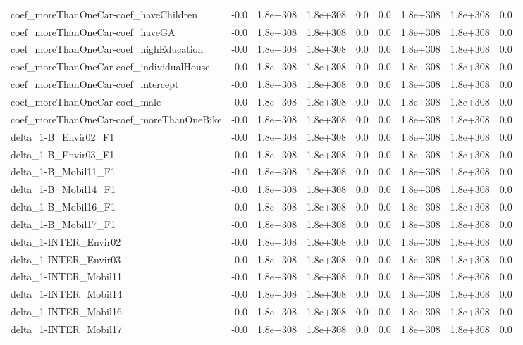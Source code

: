 \begin{tabular}{lrrrrrrrr}
coef_moreThanOneCar-coef_haveChildren & -0.0 & 1.8e+308 & 1.8e+308 & 0.0 & 0.0 & 1.8e+308 & 1.8e+308 & 0.0 \\
coef_moreThanOneCar-coef_haveGA & -0.0 & 1.8e+308 & 1.8e+308 & 0.0 & 0.0 & 1.8e+308 & 1.8e+308 & 0.0 \\
coef_moreThanOneCar-coef_highEducation & -0.0 & 1.8e+308 & 1.8e+308 & 0.0 & 0.0 & 1.8e+308 & 1.8e+308 & 0.0 \\
coef_moreThanOneCar-coef_individualHouse & -0.0 & 1.8e+308 & 1.8e+308 & 0.0 & 0.0 & 1.8e+308 & 1.8e+308 & 0.0 \\
coef_moreThanOneCar-coef_intercept & -0.0 & 1.8e+308 & 1.8e+308 & 0.0 & 0.0 & 1.8e+308 & 1.8e+308 & 0.0 \\
coef_moreThanOneCar-coef_male & -0.0 & 1.8e+308 & 1.8e+308 & 0.0 & 0.0 & 1.8e+308 & 1.8e+308 & 0.0 \\
coef_moreThanOneCar-coef_moreThanOneBike & -0.0 & 1.8e+308 & 1.8e+308 & 0.0 & 0.0 & 1.8e+308 & 1.8e+308 & 0.0 \\
delta_1-B_Envir02_F1 & -0.0 & 1.8e+308 & 1.8e+308 & 0.0 & 0.0 & 1.8e+308 & 1.8e+308 & 0.0 \\
delta_1-B_Envir03_F1 & -0.0 & 1.8e+308 & 1.8e+308 & 0.0 & 0.0 & 1.8e+308 & 1.8e+308 & 0.0 \\
delta_1-B_Mobil11_F1 & -0.0 & 1.8e+308 & 1.8e+308 & 0.0 & 0.0 & 1.8e+308 & 1.8e+308 & 0.0 \\
delta_1-B_Mobil14_F1 & -0.0 & 1.8e+308 & 1.8e+308 & 0.0 & 0.0 & 1.8e+308 & 1.8e+308 & 0.0 \\
delta_1-B_Mobil16_F1 & -0.0 & 1.8e+308 & 1.8e+308 & 0.0 & 0.0 & 1.8e+308 & 1.8e+308 & 0.0 \\
delta_1-B_Mobil17_F1 & -0.0 & 1.8e+308 & 1.8e+308 & 0.0 & 0.0 & 1.8e+308 & 1.8e+308 & 0.0 \\
delta_1-INTER_Envir02 & -0.0 & 1.8e+308 & 1.8e+308 & 0.0 & 0.0 & 1.8e+308 & 1.8e+308 & 0.0 \\
delta_1-INTER_Envir03 & -0.0 & 1.8e+308 & 1.8e+308 & 0.0 & 0.0 & 1.8e+308 & 1.8e+308 & 0.0 \\
delta_1-INTER_Mobil11 & -0.0 & 1.8e+308 & 1.8e+308 & 0.0 & 0.0 & 1.8e+308 & 1.8e+308 & 0.0 \\
delta_1-INTER_Mobil14 & -0.0 & 1.8e+308 & 1.8e+308 & 0.0 & 0.0 & 1.8e+308 & 1.8e+308 & 0.0 \\
delta_1-INTER_Mobil16 & -0.0 & 1.8e+308 & 1.8e+308 & 0.0 & 0.0 & 1.8e+308 & 1.8e+308 & 0.0 \\
delta_1-INTER_Mobil17 & -0.0 & 1.8e+308 & 1.8e+308 & 0.0 & 0.0 & 1.8e+308 & 1.8e+308 & 0.0 \\

\end{tabular}
